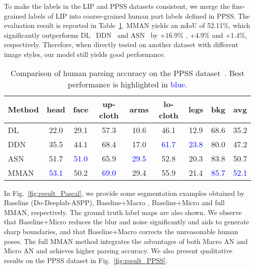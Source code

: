 \documentclass[runningheads]{llncs}
\begin{document}
To make the labels in the LIP and PPSS datasets consistent, we merge the fine-grained labels of LIP into coarse-grained human part labels defined in PPSS. The evaluation result is reported in Table~\ref{tab:PPSS}. MMAN yields an mIoU of 52.11\%, which significantly outperforms DL~\cite{luo2013pedestrian} DDN~\cite{luo2013pedestrian} and ASN~\cite{luc2016semantic} by +16.9\% , +4.9\% and +1.4\%, respectively. Therefore, when directly tested on another dataset with different image styles, our model still yields good performance.

\begin{table}[t]
\centering
\scriptsize
\tabcolsep 0.12in
\caption{Comparison of human parsing accuracy on the PPSS dataset~\cite{luo2013pedestrian}. Best performance is highlighted in \textcolor{blue}{blue}.}
\label{tab:PPSS}
\begin{tabular}{l|cccccccc}
\toprule[0.7pt]
Method                          &   head    &   face    &   up-cloth    &   arms    &   lo-cloth    &   legs    &   bkg     &   avg \\
\hline
DL~\cite{luo2013pedestrian}     &   22.0    &   29.1    &   57.3        &   10.6    &   46.1        &   12.9    &   68.6    &   35.2    \\
DDN~\cite{luo2013pedestrian}    &   35.5	&   44.1    &   68.4        &   17.0    &   \textcolor{blue}{61.7}  &   \textcolor{blue}{23.8}  &   80.0    &   47.2    \\
ASN~\cite{luc2016semantic}      &   51.7    &   \textcolor{blue}{51.0}  &   65.9    &   \textcolor{blue}{29.5}  &   52.8    &   20.3    &   83.8    &   50.7    \\
MMAN							&   \textcolor{blue}{53.1}  &   50.2    &   \textcolor{blue}{69.0}  &   29.4    &   55.9    &   21.4    &   \textcolor{blue}{85.7}  &   \textcolor{blue}{52.1}  \\

\bottomrule[0.7pt]
\end{tabular}
\end{table}

In Fig.~\ref{fig:result_Pascal}, we provide some segmentation examples obtained by Baseline (Do-Deeplab-ASPP), Baseline+Macro , Baseline+Micro  and full MMAN, respectively. The ground truth label maps are also shown.
We observe that Baseline+Micro  reduces the blur and noise significantly and aids to generate sharp boundaries, and that Baseline+Macro  corrects the unreasonable human poses. The full MMAN method integrates the advantages of both Macro AN and Micro AN and achieves higher parsing accuracy. We also present qualitative results on the PPSS dataset in Fig.~\ref{fig:result_PPSS}.
\end{document}
